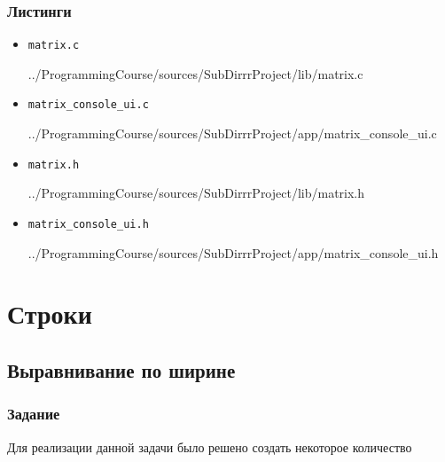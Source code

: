 \documentclass[12pt,a4paper]{report}
\begin{document}
\subsection*{Листинги}
\begin{itemize}
\item[] \verb-matrix.c-

{../ProgrammingCourse/sources/SubDirrrProject/lib/matrix.c}
\item[] \verb-matrix_console_ui.c-

{../ProgrammingCourse/sources/SubDirrrProject/app/matrix_console_ui.c}
\item[] \verb-matrix.h-

{../ProgrammingCourse/sources/SubDirrrProject/lib/matrix.h}
\item[] \verb-matrix_console_ui.h-

{../ProgrammingCourse/sources/SubDirrrProject/app/matrix_console_ui.h}
\end{itemize}


%
\chapter{Строки}
\section{Выравнивание по ширине}
\subsection{Задание}
\hspace{\parindent}
Для реализации данной задачи было решено создать некоторое количество 
\end{document}
